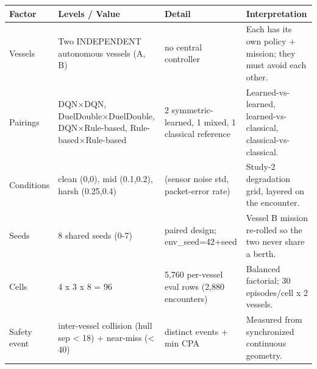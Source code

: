 \begin{tabular}{llll}
\toprule
Factor & Levels / Value & Detail & Interpretation \\
\midrule
Vessels & Two INDEPENDENT autonomous vessels (A, B) & no central controller & Each has its own policy + mission; they must avoid each other. \\
Pairings & DQN×DQN, DuelDouble×DuelDouble, DQN×Rule-based, Rule-based×Rule-based & 2 symmetric-learned, 1 mixed, 1 classical reference & Learned-vs-learned, learned-vs-classical, classical-vs-classical. \\
Conditions & clean (0,0), mid (0.1,0.2), harsh (0.25,0.4) & (sensor noise std, packet-error rate) & Study-2 degradation grid, layered on the encounter. \\
Seeds & 8 shared seeds (0-7) & paired design; env\_seed=42+seed & Vessel B mission re-rolled so the two never share a berth. \\
Cells & 4 x 3 x 8 = 96 & 5,760 per-vessel eval rows (2,880 encounters) & Balanced factorial; 30 episodes/cell x 2 vessels. \\
Safety event & inter-vessel collision (hull sep < 18) + near-miss (< 40) & distinct events + min CPA & Measured from synchronized continuous geometry. \\
\bottomrule
\end{tabular}
